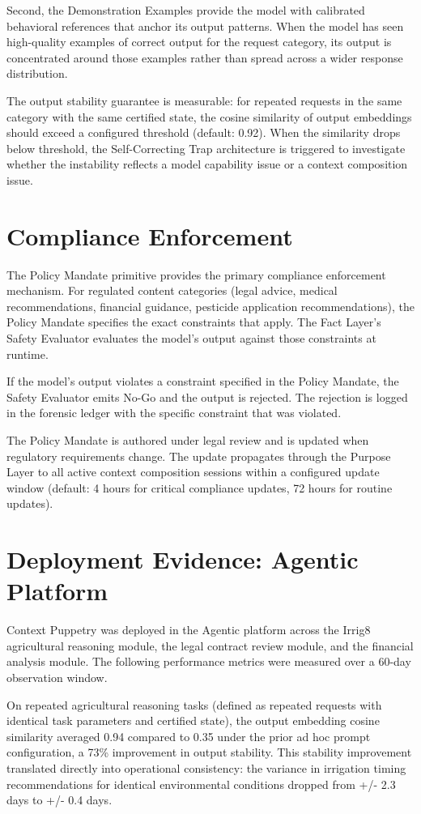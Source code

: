 \documentclass[12pt]{article}
\begin{document}
Second, the Demonstration Examples provide the model with calibrated behavioral references that anchor its output patterns. When the model has seen high-quality examples of correct output for the request category, its output is concentrated around those examples rather than spread across a wider response distribution.

The output stability guarantee is measurable: for repeated requests in the same category with the same certified state, the cosine similarity of output embeddings should exceed a configured threshold (default: 0.92). When the similarity drops below threshold, the Self-Correcting Trap architecture is triggered to investigate whether the instability reflects a model capability issue or a context composition issue.

\section{Compliance Enforcement}
The Policy Mandate primitive provides the primary compliance enforcement mechanism. For regulated content categories (legal advice, medical recommendations, financial guidance, pesticide application recommendations), the Policy Mandate specifies the exact constraints that apply. The Fact Layer's Safety Evaluator evaluates the model's output against those constraints at runtime.

If the model's output violates a constraint specified in the Policy Mandate, the Safety Evaluator emits No-Go and the output is rejected. The rejection is logged in the forensic ledger with the specific constraint that was violated.

The Policy Mandate is authored under legal review and is updated when regulatory requirements change. The update propagates through the Purpose Layer to all active context composition sessions within a configured update window (default: 4 hours for critical compliance updates, 72 hours for routine updates).

\section{Deployment Evidence: Agentic Platform}
Context Puppetry was deployed in the Agentic platform across the Irrig8 agricultural reasoning module, the legal contract review module, and the financial analysis module. The following performance metrics were measured over a 60-day observation window.

On repeated agricultural reasoning tasks (defined as repeated requests with identical task parameters and certified state), the output embedding cosine similarity averaged 0.94 compared to 0.35 under the prior ad hoc prompt configuration, a 73\% improvement in output stability. This stability improvement translated directly into operational consistency: the variance in irrigation timing recommendations for identical environmental conditions dropped from +/- 2.3 days to +/- 0.4 days.
\end{document}
